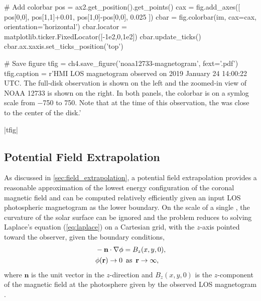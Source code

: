 \begin{pycode}[chapter4]
# Add colorbar
pos = ax2.get_position().get_points()
cax = fig.add_axes([
    pos[0,0], pos[1,1]+0.01, pos[1,0]-pos[0,0], 0.025
])
cbar = fig.colorbar(im, cax=cax, orientation='horizontal')
cbar.locator = matplotlib.ticker.FixedLocator([-1e2,0,1e2])
cbar.update_ticks()
cbar.ax.xaxis.set_ticks_position('top')

# Save figure
tfig = ch4.save_figure('noaa12733-magnetogram', fext='.pdf')
tfig.caption = r'HMI LOS magnetogram observed on 2019 January 24 14:00:22 UTC. The full-disk observation is shown on the left and the zoomed-in view of NOAA 12733 is shown on the right. In both panels, the colorbar is on a symlog scale from \SI{-750}{\gauss} to \SI{750}{\gauss}. Note that at the time of this observation, the \AR{} was close to the center of the disk.'
\end{pycode}
\py[chapter4]|tfig|

\subsection{Potential Field Extrapolation}\label{sec:potential_field}

As discussed in \autoref{sec:field_extrapolation}, a potential field extrapolation provides a reasonable approximation of the lowest energy configuration of the coronal magnetic field and can be computed relatively efficiently given an input LOS photospheric magnetogram as the lower boundary. On the scale of a single \AR{}, the curvature of the solar surface can be ignored and  the problem reduces to solving Laplace's equation (\autoref{eq:laplace}) on a Cartesian grid, with the $z$-axis pointed toward the observer, given the boundary conditions,
\begin{align}\label{eq:potential_bcs}
    &-\mathbf{n}\cdot\nabla\phi = B_z(x,y,0), \\
    &\phi(\mathbf{r})\to0 \enspace \textup{as} \enspace \mathbf{r}\to\infty,
\end{align}
where $\mathbf{n}$ is the unit vector in the $z$-direction and $B_z(x,y,0)$ is the $z$-component of the magnetic field at the photosphere given by the observed LOS magnetogram \citep{sakurai_greens_1982}.

